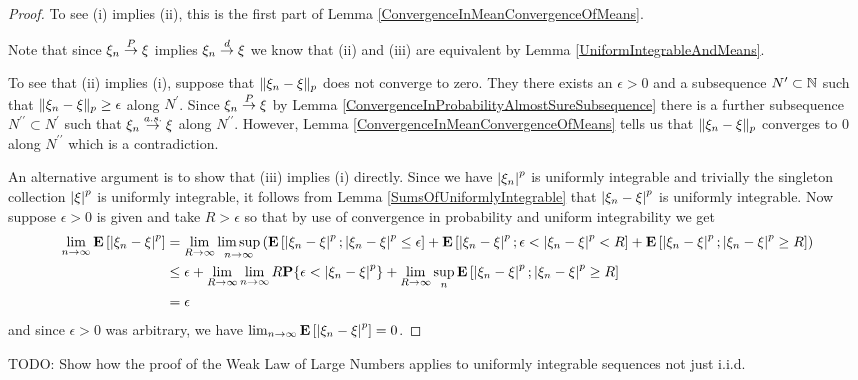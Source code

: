 \begin{proof}
To see (i) implies (ii), this is the first part of Lemma \ref{ConvergenceInMeanConvergenceOfMeans}.

Note that since $\xi_n \overset{P}\to \xi$ implies $\xi_n \overset{d}\to \xi$ we
know that (ii) and (iii) are equivalent by Lemma \ref{UniformIntegrableAndMeans}.

To see that (ii) implies (i), suppose that $\lVert \xi_n - \xi \rVert_p$
does not converge to zero.  They there exists an $\epsilon > 0$ and a subsequence $N^\prime
\subset \mathbb{N}$ such that $\lVert \xi_n - \xi \rVert_p \geq \epsilon$
along $N^\prime$.  Since $\xi_n \overset{P}\to \xi$ by Lemma
\ref{ConvergenceInProbabilityAlmostSureSubsequence} there is a further
subsequence $N^{\prime \prime} \subset N^\prime$ such that $\xi_n
\overset{a.s.}\to \xi$ along $N^{\prime \prime}$.  However, Lemma
\ref{ConvergenceInMeanConvergenceOfMeans} tells us that $\lVert \xi_n -
  \xi \rVert_p$ converges to $0$ along $N^{\prime \prime}$ which is a
contradiction.

An alternative argument is to show that (iii) implies (i) directly.
Since we have $\left \vert \xi_n \right \vert^p$ is uniformly integrable and trivially the
singleton collection $\left \vert \xi \right \vert^p$ is uniformly integrable, it follows from
Lemma \ref{SumsOfUniformlyIntegrable} that $\left \vert \xi_n - \xi \right \vert^p$ is
uniformly integrable.  Now suppose $\epsilon>0$ is given and take $R >
\epsilon$ so that by use of convergence in probability and uniform
integrability we get
\begin{align*}
\lim_{n \to \infty} \textbf{E}\left[\left \vert \xi_n - \xi \right \vert^p\right] &= \lim_{R \to
  \infty} \limsup_{n \to \infty} \left( \textbf{E}\left[\left \vert \xi_n - \xi \right \vert^p;
\left \vert \xi_n - \xi \right \vert^p \leq \epsilon \right] + \textbf{E}\left[\left \vert \xi_n - \xi \right \vert^p;
\epsilon < \left \vert \xi_n - \xi \right \vert^p < R\right] + \textbf{E}\left[\left \vert \xi_n - \xi \right \vert^p;
\left \vert \xi_n - \xi \right \vert^p \geq R\right] \right)\\
&\leq \epsilon + \lim_{R \to \infty} \lim_{n \to \infty} R \textbf{P}\{\epsilon <
  \left \vert \xi_n - \xi \right \vert^p\} + 
\lim_{R \to \infty} \sup_n \textbf{E}\left[\left \vert \xi_n - \xi \right \vert^p;
\left \vert \xi_n - \xi \right \vert^p \geq R\right] \\
&= \epsilon
\end{align*}
and since $\epsilon > 0$ was arbitrary, we have $\lim_{n \to \infty} \textbf{E}\left[\left \vert \xi_n - \xi \right \vert^p\right] =0$.
\end{proof}

TODO: Show how the proof of the Weak Law of Large Numbers applies to
uniformly integrable sequences not just i.i.d.

